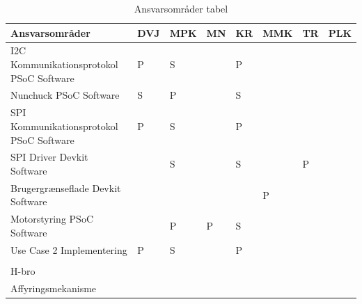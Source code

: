 \begin{table}[H]
	\centering
	\begin{tabular}{llllllll}
		\hline
		\multicolumn{1}{|l|}{Ansvarsområder}     & \multicolumn{1}{l|}{DVJ} & \multicolumn{1}{l|}{MPK} & \multicolumn{1}{l|}{MN} & \multicolumn{1}{l|}{KR} & \multicolumn{1}{l|}{MMK} & \multicolumn{1}{l|}{TR} & \multicolumn{1}{l|}{PLK} \\ \hline
		\rowcolor[HTML]{CBCEFB} 
		I2C Kommunikationsprotokol PSoC Software & P                        & S                        &                         & P                       &                          &                         &                          \\
		Nunchuck PSoC Software                   & S                        & P                        &                         & S                       &                          &                         &                          \\
		\rowcolor[HTML]{CBCEFB} 
		SPI Kommunikationsprotokol PSoC Software & P                        & S                        &                         & P                       &                          &                         &                          \\
		SPI Driver Devkit Software               &                          & S                        &                         & S                       &                          & P                       &                          \\
		\rowcolor[HTML]{CBCEFB} 
		Brugergrænseflade Devkit Software        &                          &                          &                         &                         & P                        &                         &                          \\
		Motorstyring PSoC Software               &                          & P                        & P                       & S                       &                          &                         &                          \\
		\rowcolor[HTML]{CBCEFB} 
		Use Case 2 Implementering                & P                        & S                        &                         & P                       &                          &                         &                          \\
		&                          &                          &                         &                         &                          &                         &                          \\
		\rowcolor[HTML]{CBCEFB} 
		H-bro                                    &                          &                          &                         &                         &                          &                         &                          \\
		Affyringsmekanisme                       &                          &                          &                         &                         &                          &                         &                         
	\end{tabular}
		\caption{Ansvarsområder tabel}
		\label{ansvarsområder}
\end{table}